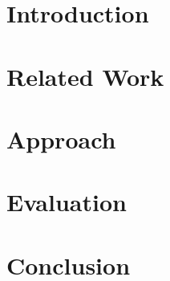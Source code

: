 \documentclass[sigconf,authordraft]{acmart}
\begin{document}



\maketitle

\section{Introduction}\label{sec:intro}


\section{Related Work}\label{sec:rel}


\section{Approach}\label{sec:app}


\section{Evaluation}\label{sec:eval}


\section{Conclusion}\label{sec:con}




\end{document}
